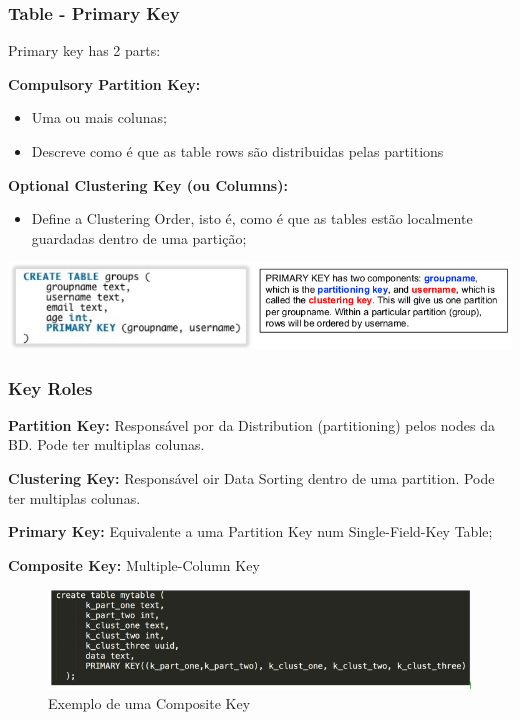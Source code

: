 \documentclass{article}
\begin{document}
\subsubsection{Table - Primary Key}

\begin{flushleft}
  Primary key has 2 parts:

  \textbf{Compulsory Partition Key:} 
  \begin{itemize}
    \item Uma ou mais colunas;
    \item Descreve como é que as table rows são distribuidas pelas partitions
  \end{itemize}

  \textbf{Optional Clustering Key (ou Columns):}
  \begin{itemize}
    \item Define a Clustering Order, isto é, como é que as tables estão localmente
    guardadas dentro de uma partição;
  \end{itemize}

  \begin{center}
    \includegraphics[scale=0.3]{24}
  \end{center}
\end{flushleft}

\subsubsection{Key Roles}

\begin{flushleft}
  \textbf{Partition Key:} Responsável por da Distribution (partitioning)
  pelos nodes da BD. Pode ter multiplas colunas.
  
  \vspace{2mm}

  \textbf{Clustering Key:} Responsável oir Data Sorting dentro de uma partition.
  Pode ter multiplas colunas.

  \vspace{2mm}

  \textbf{Primary Key:} Equivalente a uma Partition Key num Single-Field-Key Table;

  \vspace{2mm}

  \textbf{Composite Key:} Multiple-Column Key

  \begin{figure}[!h]
    \centering
    \includegraphics[scale=0.3]{25}
    \caption{Exemplo de uma Composite Key}
  \end{figure}
\end{flushleft}
\end{document}
